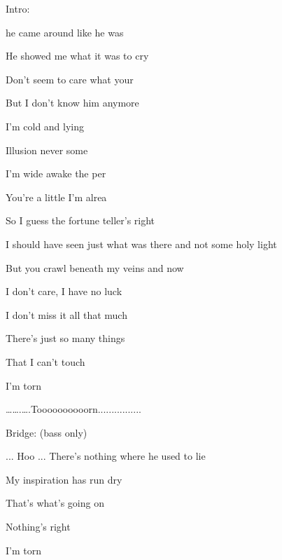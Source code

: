 
Intro: 

    

\zs

             he came around like he was 

            He showed me what it was to cry


             Don't seem to care what your 

            But I don't know him anymore 





\ks

\zr
               

             I'm cold and  lying 

             Illusion never  some

             I'm wide awake  the per

             You're a little  I'm alrea 
\kr

\zs
            So I guess the fortune teller's right

            I should have seen just what was there and not some holy light

            But you crawl beneath my veins and now

                I don't care, I have no luck

                I don't miss it all that much 

                There's just so many things

                That I can't touch

                I'm torn
\ks

\zr
\kr
             …….….Toooooooooorn................

Bridge: (bass only)

           ...  Hoo ...  
\zs
                 There's nothing where he used to lie

                 My inspiration has run dry

                 That's what's going on

                 Nothing's right

            I'm torn
\ks

\zr
\kr

\kp